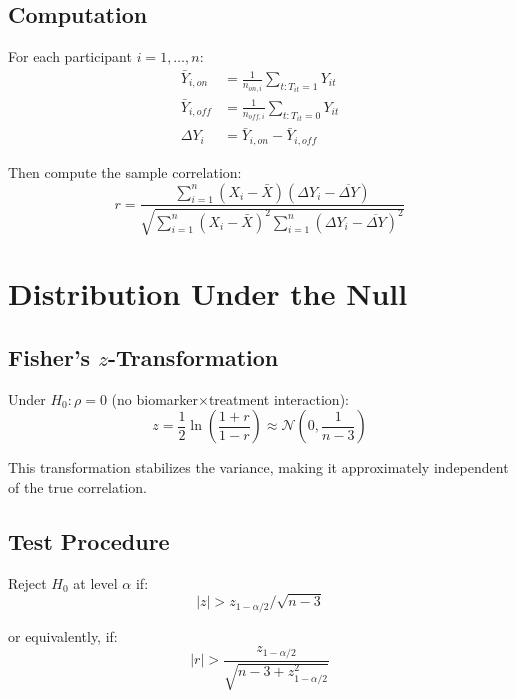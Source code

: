 \documentclass[11pt]{article}
\theoremstyle{definition}
\begin{document}
\subsection{Computation}

For each participant $i = 1, \ldots, n$:
\begin{align}
\bar{Y}_{i,on} &= \frac{1}{n_{on,i}} \sum_{t: T_{it}=1} Y_{it} \\
\bar{Y}_{i,off} &= \frac{1}{n_{off,i}} \sum_{t: T_{it}=0} Y_{it} \\
\Delta Y_i &= \bar{Y}_{i,on} - \bar{Y}_{i,off}
\end{align}

Then compute the sample correlation:
\begin{equation}
r = \frac{\sum_{i=1}^{n}(X_i - \bar{X})(\Delta Y_i - \overline{\Delta Y})}
{\sqrt{\sum_{i=1}^{n}(X_i - \bar{X})^2 \sum_{i=1}^{n}(\Delta Y_i - \overline{\Delta Y})^2}}
\end{equation}

\section{Distribution Under the Null}

\subsection{Fisher's $z$-Transformation}

Under $H_0: \rho = 0$ (no biomarker$\times$treatment interaction):
\begin{equation}
z = \frac{1}{2} \ln\left(\frac{1+r}{1-r}\right) \approx \mathcal{N}\left(0, \frac{1}{n-3}\right)
\end{equation}

This transformation stabilizes the variance, making it approximately
independent of the true correlation.

\subsection{Test Procedure}

Reject $H_0$ at level $\alpha$ if:
\begin{equation}
|z| > z_{1-\alpha/2} / \sqrt{n-3}
\end{equation}

or equivalently, if:
\begin{equation}
|r| > \frac{z_{1-\alpha/2}}{\sqrt{n-3 + z_{1-\alpha/2}^2}}
\end{equation}
\end{document}
